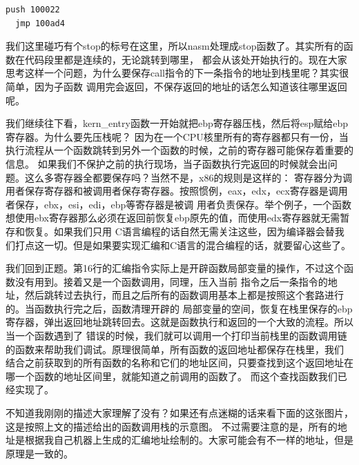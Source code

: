 \begin{Verbatim}[frame=single]
  push 100022
  jmp 100ad4
\end{Verbatim}

\par 我们这里碰巧有个stop的标号在这里，所以nasm处理成stop函数了。其实所有的函数在代码段里都是连续的，无论跳转到哪里，\allowbreak
都会从该处开始执行的。现在大家思考这样一个问题，为什么要保存call指令的下一条指令的地址到栈里呢？其实很简单，因为子函数\allowbreak
调用完会返回，不保存返回的地址的话怎么知道该往哪里返回呢。

\par 我们继续往下看，kern\_entry函数一开始就把ebp寄存器压栈，然后将esp赋给ebp寄存器。为什么要先压栈呢？\allowbreak
因为在一个CPU核里所有的寄存器都只有一份，当执行流程从一个函数跳转到另外一个函数的时候，之前的寄存器可能保存着重要的信息。\allowbreak
如果我们不保护之前的执行现场，当子函数执行完返回的时候就会出问题。这么多寄存器全都要保存吗？当然不是，x86的规则是这样的：\allowbreak
寄存器分为调用者保存寄存器和被调用者保存寄存器。按照惯例，eax，edx，ecx寄存器是调用者保存，ebx，esi，edi，ebp等寄存器是被调\allowbreak
用者负责保存。举个例子，一个函数想使用ebx寄存器那么必须在返回前恢复ebp原先的值，而使用edx寄存器就无需暂存和恢复。如果我们只用\allowbreak
C语言编程的话自然无需关注这些，因为编译器会替我们打点这一切。但是如果要实现汇编和C语言的混合编程的话，就要留心这些了。

\par 我们回到正题。第16行的汇编指令实际上是开辟函数局部变量的操作，不过这个函数没有用到。接着又是一个函数调用，同理，压入当前\allowbreak
指令之后一条指令的地址，然后跳转过去执行，而且之后所有的函数调用基本上都是按照这个套路进行的。当函数执行完之后，函数清理开辟的\allowbreak
局部变量的空间，恢复在栈里保存的ebp寄存器，弹出返回地址跳转回去。这就是函数执行和返回的一个大致的流程。所以当一个函数遇到了\allowbreak
错误的时候，我们就可以调用一个打印当前栈里的函数调用链的函数来帮助我们调试。原理很简单，所有函数的返回地址都保存在栈里，我们\allowbreak
结合之前获取到的所有函数的名称和它们的地址区间，只要查找到这个返回地址在哪一个函数的地址区间里，就能知道之前调用的函数了。\allowbreak
而这个查找函数我们已经实现了。

\par 不知道我刚刚的描述大家理解了没有？如果还有点迷糊的话来看下面的这张图片，这是按照上文的描述给出的函数调用栈的示意图。\allowbreak
不过需要注意的是，所有的地址是根据我自己机器上生成的汇编地址绘制的。大家可能会有不一样的地址，但是原理是一致的。


